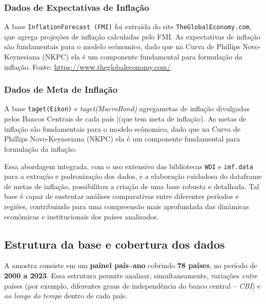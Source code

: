 \documentclass[a4paper,12pt]{article}[abnt2]
\begin{document}
\subsubsection{\textbf{Dados de Expectativas de Inflação}}

A base \texttt{InflationForecast (FMI)} foi extraída do site \texttt{TheGlobalEconomy.com}, que agrega projeções de inflação calculadas pelo FMI. As expectativas de inflação são fundamentais para o modelo ecônomico, dado que na Curva de Phillips Novo-Keynesiana (NKPC) ela é um componente fundamental para formulação da inflação. Fonte: \url{https://www.theglobaleconomy.com/}

\subsubsection{\textbf{Dados de Meta de Inflação}}

A base \texttt{taget(Eikon)} e \textit{taget(MacroBond)} agregametas de inflação divulgadas pelos Bancos Centrais de cada país |(que tem meta de inflação). As metas de inflação são fundamentais para o modelo ecônomico, dado que na Curva de Phillips Novo-Keynesiana (NKPC) ela é um componente fundamental para formulação da inflação. 

Essa abordagem integrada, com o uso extensivo das bibliotecas \texttt{WDI} \cite{WDI} e \texttt{imf.data} \cite{imf.data} para a extração e padronização dos dados, e a elaboração cuidadosa do dataframe de metas de inflação, possibilitou a criação de uma base robusta e detalhada. Tal base é capaz de sustentar análises comparativas entre diferentes períodos e regiões, contribuindo para uma compreensão mais aprofundada das dinâmicas econômicas e institucionais dos países analisados.

\subsection{\textbf{Estrutura da base e cobertura dos dados}}

A amostra consiste em um \textbf{painel país–ano} cobrindo \textbf{78 países}, no período de \textbf{2000 a 2023}. Essa estrutura permite analisar, simultaneamente, variações \emph{entre} países (por exemplo, diferentes graus de independência do banco central – \emph{CBI}) e \emph{ao longo do tempo} dentro de cada país.
\end{document}
